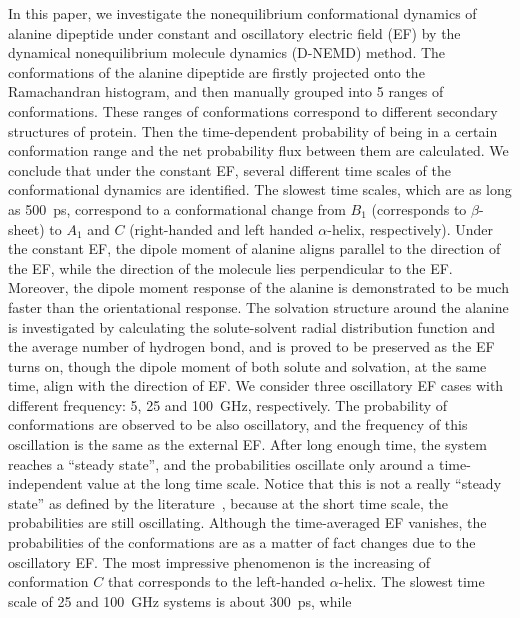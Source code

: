 \documentclass[a4paper,preprint,unsortedaddress,onecolumn]{revtex4-1}
\begin{document}
In this paper, we investigate the nonequilibrium conformational
dynamics of alanine dipeptide under constant and oscillatory electric
field (EF) by the dynamical nonequilibrium molecule dynamics (D-NEMD) method.
The conformations of the alanine dipeptide are
firstly projected onto the Ramachandran histogram, and
then manually grouped into 5 ranges of conformations.
These ranges of conformations
correspond to different secondary structures of protein.
Then the time-dependent probability
of being in a certain conformation range and the net probability flux
between them are calculated. 
We conclude that under the constant EF, several different time scales
of the conformational dynamics are identified. The slowest time scales,
which are as long as 500~ps, correspond to a conformational change
from $B_1$ (corresponds to $\beta$-sheet) to $A_1$ and $C$ (right-handed
and left handed $\alpha$-helix, respectively).
Under the constant EF, the dipole moment of alanine aligns parallel to the direction
of the EF, while the direction of the molecule lies perpendicular to the
EF. Moreover, the dipole moment response of the alanine is
demonstrated to be much faster than the orientational response.
The solvation structure around the alanine is investigated
by calculating the solute-solvent radial distribution function and the average number of hydrogen
bond, and is proved to be preserved as the EF turns on, though the
dipole moment of both solute and solvation, at the same time, align with the direction of EF.
We consider three oscillatory EF cases with different frequency:
5, 25 and 100~GHz, respectively. The
probability of conformations are observed to be also oscillatory,
and the frequency of this oscillation is the same as the external EF.
After long enough time,
the system reaches a ``steady state'', and the probabilities oscillate only around
a time-independent value at the long time scale. Notice that this is not a really ``steady state'' as defined by
the literature~\cite{seifert2010fluctuation}, because at the
short time scale, the probabilities are still oscillating.
Although the time-averaged EF vanishes, the probabilities of the conformations
are as a matter of fact changes due to the oscillatory EF. The most impressive phenomenon
is the increasing of conformation $C$ that corresponds to
the left-handed $\alpha$-helix.
The slowest time scale of 25 and 100~GHz systems is about 300~ps, while
\end{document}
